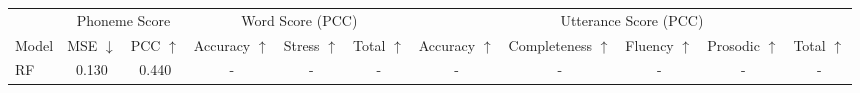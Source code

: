 \documentclass{article}
\begin{document}
\begin{table}[]
\small
\centering
\setlength\tabcolsep{4.3pt}
\begin{tabular}{lcccccccccc}
\hline
\multicolumn{1}{c}{}                        & \multicolumn{2}{c}{Phoneme  Score}                                                                                                                             & \multicolumn{3}{c}{Word Score (PCC)}                                                                                                                                                                                                          & \multicolumn{5}{c}{Utterance Score (PCC)}                                                                                                                                                                                                                                                                                                                                                                     \\ \cline{2-11} 
\multicolumn{1}{c}{\multirow{-2}{*}{Model}} & \multicolumn{1}{l}{MSE $\downarrow$}                                                       & \multicolumn{1}{c|}{PCC $\uparrow$}                                                     & Accuracy $\uparrow$                                                                      & Stress $\uparrow$                                                                     & \multicolumn{1}{c|}{Total $\uparrow$}                                                    & Accuracy $\uparrow$                                                                      & Completeness $\uparrow$                                                                  & Fluency $\uparrow$                                                                       & Prosodic $\uparrow$                                                                      & Total $\uparrow$                                                                         \\ \hline
RF~\cite{zhang2021speechocean762}                               & 0.130                                                                         & 0.440                                                                        & -                                                                             & -                                                                             & -                                                                             & -                                                                             & -                                                                             & -                                                                             & -                                                                             & -                                                                             \\

\end{tabular}
\end{table}
\end{document}
